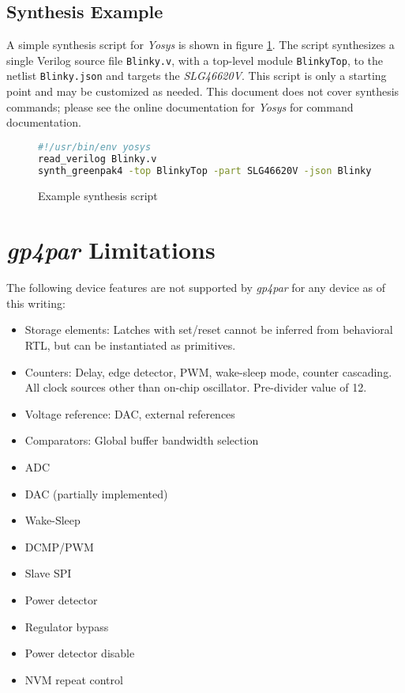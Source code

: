 \documentclass[11pt]{article}
\newcommand{\namestyle}[1]{\textit{#1}}
\begin{document}
\subsection{Synthesis Example}

A simple synthesis script for \namestyle{Yosys} is shown in figure \ref{yscript}. The script synthesizes a single
Verilog source file \texttt{Blinky.v}, with a top-level module \texttt{BlinkyTop}, to the netlist \texttt{Blinky.json}
and targets the \namestyle{SLG46620V}. This script is only a starting point and may be customized as needed. This
document does not cover synthesis commands; please see the online documentation for \namestyle{Yosys} for command
documentation.

\begin{figure}[h]
\begin{lstlisting}[language=sh]
#!/usr/bin/env yosys
read_verilog Blinky.v
synth_greenpak4 -top BlinkyTop -part SLG46620V -json Blinky.json
\end{lstlisting}
\caption{Example synthesis script}
\label{yscript}
\end{figure}

\pagebreak
\section{\namestyle{gp4par} Limitations}

The following device features are not supported by \namestyle{gp4par} for any device as of this writing:

\begin{itemize}
\item Storage elements: Latches with set/reset cannot be inferred from behavioral RTL, but can be instantiated as primitives.
\item Counters: Delay, edge detector, PWM, wake-sleep mode, counter cascading.
All clock sources other than on-chip oscillator. Pre-divider value of 12.
\item Voltage reference: DAC, external references
\item Comparators: Global buffer bandwidth selection
\item ADC
\item DAC (partially implemented)
\item Wake-Sleep
\item DCMP/PWM
\item Slave SPI
\item Power detector
\item Regulator bypass
\item Power detector disable
\item NVM repeat control
\end{itemize}
\end{document}
